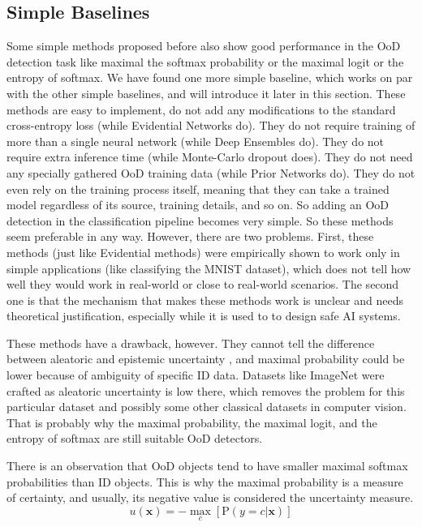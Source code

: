 \documentclass{article}
\begin{document}
\subsection{Simple Baselines}
Some simple methods proposed before also show good performance in the OoD detection task like maximal the softmax probability \cite{max_proba, odin} or the maximal logit \cite{max_logit} or the entropy of softmax.
We have found one more simple baseline, which works on par with the other simple baselines, and will introduce it later in this section.
These methods are easy to implement, do not add any modifications to the standard cross-entropy loss (while Evidential Networks do).
They do not require training of more than a single neural network (while Deep Ensembles do).
They do not require extra inference time (while Monte-Carlo dropout does).
They do not need any specially gathered OoD training data (while Prior Networks do).
They do not even rely on the training process itself, meaning that they can take a trained model regardless of its source, training details, and so on.
So adding an OoD detection in the classification pipeline becomes very simple.
So these methods seem preferable in any way.
However, there are two problems.
First, these methods (just like Evidential methods) were empirically shown to work only in simple applications (like classifying the MNIST dataset), which does not tell how well they would work in real-world or close to real-world scenarios.
The second one is that the mechanism that makes these methods work is unclear and needs theoretical justification, especially while it is used to to design safe AI systems.

These methods have a drawback, however.
They cannot tell the difference between aleatoric and epistemic uncertainty \cite{yarin_gal_phd}, and maximal probability could be lower because of ambiguity of specific ID data.
Datasets like ImageNet were crafted as aleatoric uncertainty is low there, which removes the problem for this particular dataset and possibly some other classical datasets in computer vision.
That is probably why the maximal probability, the maximal logit, and the entropy of softmax are still suitable OoD detectors.

There is an observation \cite{max_proba} that OoD objects tend to have smaller maximal softmax probabilities than ID objects. This is why the maximal probability is a measure of certainty, and usually, its negative value is considered the uncertainty measure.
\begin{equation}
u(\boldsymbol{x}) = -\max\limits_c [\mathrm{P}(y = c | \boldsymbol{x})]
\end{equation}
\end{document}
